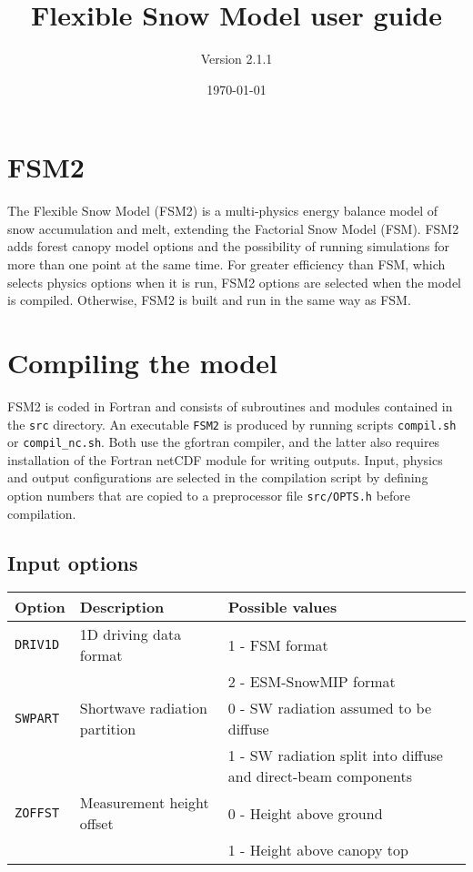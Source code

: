 \documentclass{article}
\title{Flexible Snow Model user guide}
\author{Version 2.1.1}
\date{\today}
\begin{document}
\maketitle
\parindent0pt

\section{FSM2}

The Flexible Snow Model (FSM2) is a multi-physics energy balance model of snow accumulation and melt, extending the Factorial Snow Model (FSM). FSM2 adds forest canopy model options and the possibility of running simulations for more than one point at the same time. For greater efficiency than FSM, which selects physics options when it is run, FSM2 options are selected when the model is compiled. Otherwise, FSM2 is built and run in the same way as FSM.

\section{Compiling the model}

FSM2 is coded in Fortran and consists of subroutines and modules contained in the {\tt src} directory. An executable {\tt FSM2} is produced by running scripts {\tt compil.sh} or {\tt compil\_nc.sh}. Both use the gfortran compiler, and the latter also requires installation of the Fortran netCDF module for writing outputs. Input, physics and output configurations are selected in the compilation script by defining option numbers that are copied to a preprocessor file {\tt src/OPTS.h} before compilation.

\subsection{Input options }
\begin{longtable}{|l|l|l|} \hline
Option       & Description & Possible values \\ \hline
{\tt DRIV1D} & 1D driving data format
&   1 - FSM format \\
& & 2 - ESM-SnowMIP format \\ \hline
{\tt SWPART} & Shortwave radiation partition
&   0 - SW radiation assumed to be diffuse \\
& & 1 - SW radiation split into diffuse and direct-beam components \\ \hline
{\tt ZOFFST} & Measurement height offset
&   0 - Height above ground \\
& & 1 - Height above canopy top \\ \hline
\end{longtable}
\end{document}
